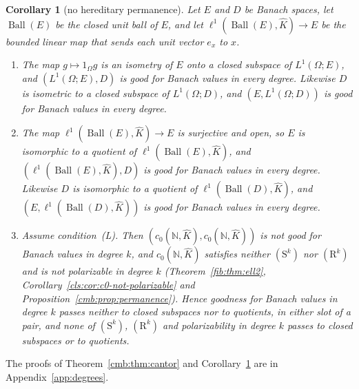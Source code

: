 \documentclass[11pt]{amsart}
\newtheorem{corollary}[theorem]{Corollary}
\theoremstyle{definition}
\theoremstyle{remark}
\numberwithin{equation}{section}
\newcommand{\N}{\mathbb N}
\newcommand{\Kh}{\widehat K}
\theoremstyle{plain}
\theoremstyle{definition}
\theoremstyle{plain}
\begin{document}
\begin{corollary}[no hereditary permanence]\label{cmb:cor:no-hereditary}
Let $E$ and $D$ be Banach spaces, let $\operatorname{Ball}(E)$ be the closed unit ball of $E$, and let
$\ell^1(\operatorname{Ball}(E),\Kh)\to E$ be the bounded linear map that sends each unit vector $e_x$ to $x$.
\begin{enumerate}
\item The map $g\mapsto1_\Omega g$ is an isometry of $E$ onto a closed subspace of $L^1(\Omega;E)$, and
$(L^1(\Omega;E),D)$ is good for Banach values in every degree. Likewise $D$ is isometric to a closed subspace of
$L^1(\Omega;D)$, and $(E,L^1(\Omega;D))$ is good for Banach values in every degree.
\item The map $\ell^1(\operatorname{Ball}(E),\Kh)\to E$ is surjective and open, so $E$ is isomorphic to a quotient of $\ell^1(\operatorname{Ball}(E),\Kh)$, and
$(\ell^1(\operatorname{Ball}(E),\Kh),D)$ is good for Banach values in every degree. Likewise $D$ is isomorphic to a quotient of
$\ell^1(\operatorname{Ball}(D),\Kh)$, and $(E,\ell^1(\operatorname{Ball}(D),\Kh))$ is good for Banach values in every degree.
\item Assume condition~\textup{(L)}. Then $(c_0(\N,\Kh),c_0(\N,\Kh))$ is not good for Banach values in degree $k$, and
$c_0(\N,\Kh)$ satisfies neither $(\mathrm S^k)$ nor $(\mathrm R^k)$ and is not polarizable in degree $k$
(Theorem~\ref{fib:thm:ell2}, Corollary~\ref{cls:cor:c0-not-polarizable} and Proposition~\ref{cmb:prop:permanence}). Hence
goodness for Banach values in degree $k$ passes neither to closed subspaces nor to quotients, in either slot of a pair, and
none of $(\mathrm S^k)$, $(\mathrm R^k)$ and polarizability in degree $k$ passes to closed subspaces or to quotients.
\end{enumerate}
\end{corollary}

The proofs of Theorem~\ref{cmb:thm:cantor} and Corollary~\ref{cmb:cor:no-hereditary} are in Appendix~\ref{app:degrees}.
\end{document}
